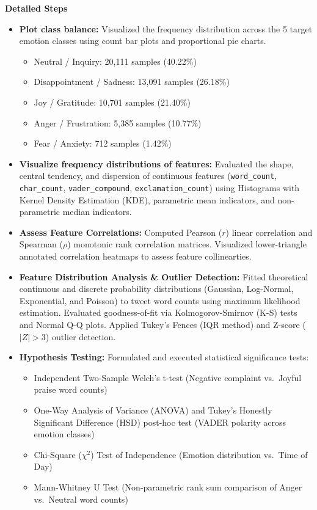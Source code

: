 \documentclass[12pt]{article}
\begin{document}
\vspace{0.8em}

\noindent \textbf{Detailed Steps}

\begin{itemize}[leftmargin=1.5em]
    \item \textbf{Plot class balance:} Visualized the frequency distribution across the 5 target emotion classes using count bar plots and proportional pie charts.
    \begin{itemize}
        \item Neutral / Inquiry: 20,111 samples (40.22\%)
        \item Disappointment / Sadness: 13,091 samples (26.18\%)
        \item Joy / Gratitude: 10,701 samples (21.40\%)
        \item Anger / Frustration: 5,385 samples (10.77\%)
        \item Fear / Anxiety: 712 samples (1.42\%)
    \end{itemize}

    \item \textbf{Visualize frequency distributions of features:} Evaluated the shape, central tendency, and dispersion of continuous features (\texttt{word\_count}, \texttt{char\_count}, \texttt{vader\_compound}, \texttt{exclamation\_count}) using Histograms with Kernel Density Estimation (KDE), parametric mean indicators, and non-parametric median indicators.

    \item \textbf{Assess Feature Correlations:} Computed Pearson ($r$) linear correlation and Spearman ($\rho$) monotonic rank correlation matrices. Visualized lower-triangle annotated correlation heatmaps to assess feature collinearties.

    \item \textbf{Feature Distribution Analysis \& Outlier Detection:} Fitted theoretical continuous and discrete probability distributions (Gaussian, Log-Normal, Exponential, and Poisson) to tweet word counts using maximum likelihood estimation. Evaluated goodness-of-fit via Kolmogorov-Smirnov (K-S) tests and Normal Q-Q plots. Applied Tukey's Fences (IQR method) and Z-score ($|Z| > 3$) outlier detection.

    \item \textbf{Hypothesis Testing:} Formulated and executed statistical significance tests:
    \begin{itemize}
        \item Independent Two-Sample Welch's t-test (Negative complaint vs.\ Joyful praise word counts)
        \item One-Way Analysis of Variance (ANOVA) and Tukey's Honestly Significant Difference (HSD) post-hoc test (VADER polarity across emotion classes)
        \item Chi-Square ($\chi^2$) Test of Independence (Emotion distribution vs.\ Time of Day)
        \item Mann-Whitney U Test (Non-parametric rank sum comparison of Anger vs.\ Neutral word counts)
    \end{itemize}


\end{itemize}
\end{document}
